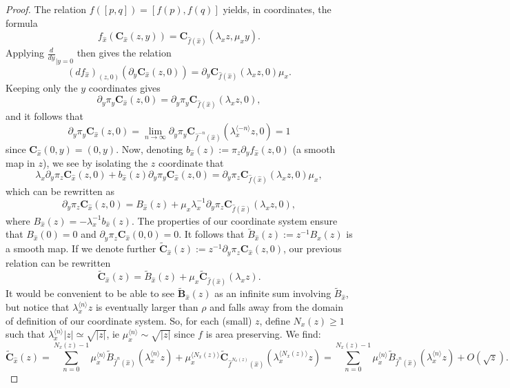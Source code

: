 \documentclass[a4paper]{article}
\theoremstyle{definition}
\begin{document}
\begin{proof}
The relation $f([p,q]) = [f(p),f(q)]$ yields, in coordinates, the formula
$$ f_{\widehat{x}}( \mathbf{C}_{\widehat{x}}(z,y) ) = \mathbf{C}_{\widehat{f}({\widehat{x}})}(\lambda_x z,\mu_x y). $$
Applying $\frac{d}{dy}_{|y=0}$ then gives the relation $$ (df_{\widehat{x}})_{(z,0)}( \partial_y \mathbf{C}_{\widehat{x}}(z,0) ) = \partial_y \mathbf{C}_{\widehat{f}({\widehat{x}})}(\lambda_x z,0) \mu_x .$$
Keeping only the $y$ coordinates gives
$$ \partial_y \pi_y \mathbf{C}_{\widehat{x}}(z,0) = \partial_y \pi_y \mathbf{C}_{\widehat{f}({\widehat{x}})}(\lambda_x z,0) , $$
and it follows that $$ \partial_y \pi_y \mathbf{C}_{\widehat{x}}(z,0) = \lim_{n \rightarrow \infty} \partial_y \pi_y \mathbf{C}_{\widehat{f}^{-n}({\widehat{x}})}(\lambda_x^{\langle-n\rangle} z,0) = 1 $$
since $\mathbf{C}_{\widehat{x}}(0,y) = (0,y)$. Now, denoting $b_{\widehat{x}}(z) := \pi_z \partial_y f_{\widehat{x}}(z,0)$ (a smooth map in $z$), we see by isolating the $z$ coordinate that
$$ \lambda_x  \partial_y \pi_z \mathbf{C}_{\widehat{x}}(z,0) + b_{\widehat{x}}(z)  \partial_y \pi_y \mathbf{C}_{\widehat{x}}(z,0) = \partial_y \pi_z \mathbf{C}_{\widehat{f}({\widehat{x}})}(\lambda_x z,0) \mu_x , $$
which can be rewritten as
$$ \partial_y \pi_z \mathbf{C}_{\widehat{x}}(z,0) = B_{\widehat{x}}(z) + \mu_x \lambda_x^{-1} \partial_y \pi_z \mathbf{C}_{\widehat{f}({\widehat{x}})}(\lambda_x z,0), $$
where $B_{\widehat{x}}(z) = - \lambda_x^{-1} b_{\widehat{x}}(z)$. The properties of our coordinate system ensure that $B_{\widehat{x}}(0)=0$ and $\partial_y \pi_z \mathbf{C}_{\widehat{x}}(0,0)=0$. It follows that $\widetilde{B}_{\widehat{x}}(z) := z^{-1} B_{\widehat{x}}(z)$ is a smooth map. If we denote further $\widetilde{\mathbf{C}}_{\widehat{x}}(z) := z^{-1}{\partial_y \pi_z \mathbf{C}_{\widehat{x}}(z,0)}$, our previous relation can be rewritten
$$ \widetilde{\mathbf{C}}_{\widehat{x}}(z) = \widetilde{B}_{\widehat{x}}(z) + \mu_x \widetilde{\mathbf{C}}_{\widehat{f}({\widehat{x}})}(\lambda_x z).$$
It would be convenient to be able to see $\widetilde{\mathbf{B}}_{\widehat{x}}(z)$ as an infinite sum involving $\tilde{B}_{\widehat{x}}$, but notice that $\lambda_x^{\langle n \rangle} z$ is eventually larger than $\rho$ and falls away from the domain of definition of our coordinate system. So, for each (small) $z$, define $N_x(z) \geq 1$ such that $\lambda_x^{\langle n \rangle} |z| \simeq \sqrt{|z|}$, ie $\mu_x^{\langle n \rangle} \sim \sqrt{|z|}$ since $f$ is area preserving. We find:
$$ \widetilde{\mathbf{C}}_{\widehat{x}}(z) = \sum_{n=0}^{N_x(z)-1} \mu_x^{\langle n \rangle} \widetilde{B}_{\widehat{f}^n({\widehat{x}})}(\lambda_x^{\langle n \rangle} z) + \mu_x^{\langle N_x(z) \rangle} \widetilde{\mathbf{C}}_{\widehat{f}^{N_x(z)}({\widehat{x}})}(\lambda_x^{\langle N_x(z) \rangle} z) = \sum_{n=0}^{N_x(z)-1} \mu_x^{\langle n \rangle} \widetilde{B}_{\widehat{f}^n({\widehat{x}})}(\lambda_x^{\langle n \rangle} z) + O(\sqrt{z}).  $$

\end{proof}
\end{document}
